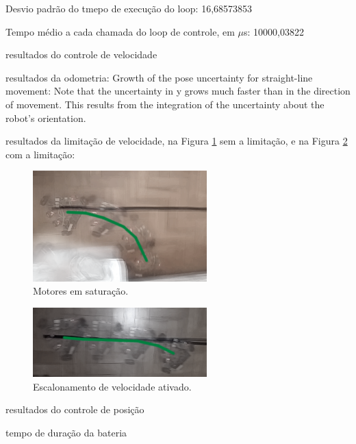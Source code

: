 Desvio padrão do tmepo de execução do loop: 16,68573853

Tempo médio a cada chamada do loop de controle, em $\mu$s: 10000,03822

resultados do controle de velocidade

resultados da odometria:
Growth of the pose uncertainty for straight-line movement: Note that the uncertainty in y grows much
faster than in the direction of movement. This results from the integration of the uncertainty about the
robot’s orientation. \citep{siegwart2011introduction}

resultados da limitação de velocidade, na Figura \ref{fig:scaling_off} sem a limitação, e na Figura \ref{fig:scaling_on} com a limitação:

\begin{figure}[h]
  \centering
  \includegraphics[width = 0.6\textwidth]{imagens/scaling_off}
  \caption{Motores em saturação.}
  \label{fig:scaling_off}
\end{figure}

\begin{figure}[h]
  \centering
  \includegraphics[width = 0.6\textwidth]{imagens/scaling_on}
  \caption{Escalonamento de velocidade ativado.}
  \label{fig:scaling_on}
\end{figure}

resultados do controle de posição

tempo de duração da bateria
